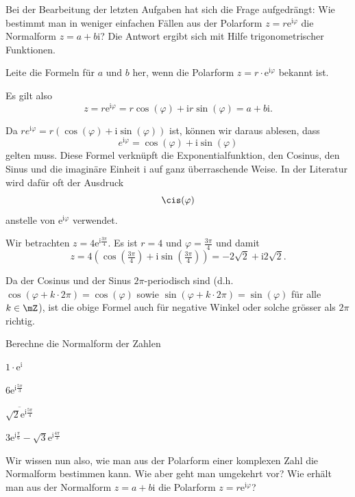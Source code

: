 \documentclass[%
11pt,%
twoside,%
titlepage,%
german,%
headsepline%
]{scrartcl}
\begin{document}
Bei der Bearbeitung der letzten Aufgaben hat sich die Frage aufgedrängt: Wie bestimmt man in weniger einfachen F\"allen aus der Polarform $z = r\mathrm{e}^{\mathrm{i}\varphi}$ die Normalform $z = a + b\mathrm{i}$? Die Antwort ergibt sich mit Hilfe trigonometrischer Funktionen.

\begin{ueb}[Basics]
Leite die Formeln f\"ur $a$ und $b$ her, wenn die Polarform $z=r\cdot \mathrm{e}^{\mathrm{i}\varphi}$ bekannt ist.
\end{ueb}
Es gilt also
$$z=r\mathrm{e}^{\mathrm{i}\varphi}=r\cos(\varphi)+\mathrm{i}r\sin(\varphi)=a+b\mathrm{i}.$$
\begin{bem}
Da $re^{\mathrm{i}\varphi} = r (\cos(\varphi) + \mathrm{i}\sin(\varphi))$ ist, k\"onnen wir daraus ablesen, dass
$$e^{\mathrm{i}\varphi} = \cos(\varphi) + \mathrm{i}\sin(\varphi)$$
gelten muss. Diese Formel verkn\"upft die Exponentialfunktion, den Cosinus, den Sinus und die imaginäre Einheit $\mathrm{i}$ auf ganz \"uberraschende Weise.
In der Literatur wird daf\"ur oft der Ausdruck
$$\cis(\varphi)$$
anstelle von $\mathrm{e}^{\mathrm{i}\varphi}$ verwendet.
\end{bem}

\begin{bsp}
Wir betrachten $z=4\mathrm{e}^{\mathrm{i}\frac{3\pi}{4}}$. Es ist $r=4$ und $\varphi=\frac{3\pi}{4}$ und damit
$$z=4(\cos(\tfrac{3\pi}{4})+\mathrm{i}\sin(\tfrac{3\pi}{4}))=-2\sqrt{2}+\mathrm{i}2\sqrt{2}.$$
\end{bsp}

\begin{bem}
Da der Cosinus und der Sinus $2\pi$-periodisch sind (d.h. $\cos(\varphi + k \cdot 2\pi) = \cos(\varphi)$ sowie $\sin(\varphi + k \cdot 2\pi) = \sin(\varphi)$ f\"ur alle $k \in \mZ$), ist die obige Formel auch f\"ur negative Winkel oder solche gr\"osser als $2\pi$ richtig.
\end{bem}

\begin{ueb}[Normalform]
Berechne die Normalform der Zahlen

\begin{minipage}{0.3\textwidth}
\begin{enumeratea}
\item $1\cdot \mathrm{e}^\mathrm{i}$
\item $6\mathrm{e}^{\mathrm{i}\frac{5\pi}{3}}$
\end{enumeratea}
\end{minipage}
\begin{minipage}{0.4\textwidth}
\begin{enumeratea}
\setcounter{enumi}{2}
\item $\overline{\sqrt{2}\mathrm{e}^{\mathrm{i}\frac{5\pi}{4}}}$
\item $3\mathrm{e}^{\mathrm{i}\frac{\pi}{6}}-\sqrt{3}\mathrm{e}^{\mathrm{i}\frac{4\pi}{3}}$
\end{enumeratea}
\end{minipage}
\end{ueb}
Wir wissen nun also, wie man aus der Polarform einer komplexen Zahl die Normalform bestimmen kann. Wie aber geht man umgekehrt vor? Wie erhält man aus der Normalform $z = a + b\mathrm{i}$ die Polarform $z = r\mathrm{e}^{\mathrm{i}\varphi}$?
\end{document}
